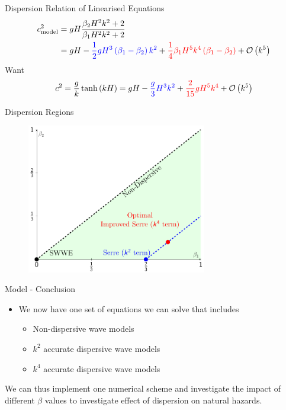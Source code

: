 \documentclass[pdf]{beamer}
\begin{document}
\begin{frame}{Dispersion Relation of Linearised Equations}
\begin{align*}
c_{\text{model}}^2 & = gH \dfrac{\beta_2 H^2 k^2 + 2}{ \beta_1H^2 k^2 + 2}
\\& = gH - {\color{blue} \frac{1}{2}gH^3 \left(\beta_1 - \beta_2\right)k^2} + {\color{red}\frac{1}{4}\beta_1 H^5 k^4\left(\beta_1 - \beta_2\right)}  + \mathcal{O}\left(k^5\right)
\end{align*}
Want
\[c^2  = \frac{g}{k} \tanh\left(kH\right) = gH - {\color{blue}\frac{g}{3} H^3 k^2} + {\color{red}\frac{2}{15} g H^5 k^4} + \mathcal{O}\left(k^5\right) \]
\end{frame}

\begin{frame}{Dispersion Regions}
\begin{figure}
	\centering
	\includegraphics[width=0.7\textwidth]{./Pics/Tex/Explanatory/RegionsPlot/BetaPlotAll.pdf}
\end{figure}
\end{frame}

\begin{frame}{Model - Conclusion}
\begin{itemize}
	\item We now have one set of equations we can solve that includes
	\begin{itemize}
		\item Non-dispersive wave models
		\item $k^2$ accurate dispersive wave models
		\item $k^4$ accurate dispersive wave models
	\end{itemize}
\end{itemize}
We can thus implement one numerical scheme and investigate the impact of different $\beta$ values to investigate effect of dispersion on natural hazards. 
\end{frame}
\end{document}
